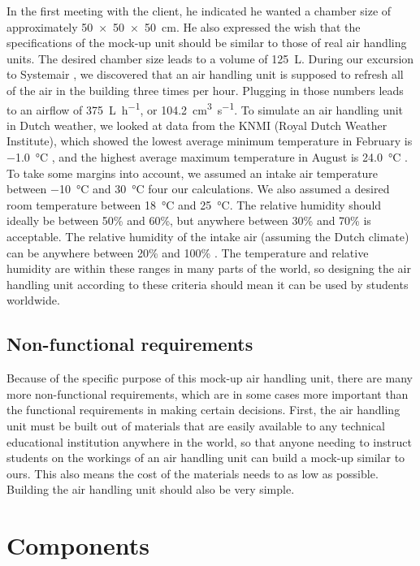 \documentclass[a4paper,oneside]{book}
\begin{document}
In the first meeting with the client, he indicated he wanted a chamber size of
approximately \SI{50x50x50}{\cm}. He also expressed the wish that the
specifications of the mock-up unit should be similar to those of real air
handling units. The desired chamber size leads to a volume of \SI{125}{\L}.
During our excursion to Systemair %
, we discovered that an air handling unit is
supposed to refresh all of the air in the building three times per hour.
Plugging in those numbers leads to an airflow of \SI{375}{\L\per\hour}, or
\SI{104.2}{\cm\cubed\per\s}. To simulate an air handling unit in Dutch weather,
we looked at data from the KNMI (Royal Dutch Weather Institute), which showed
the lowest average minimum temperature in February is \SI{-1.0}{\celsius}
\cite{knmi-min-feb}, and the highest average maximum temperature in August is
\SI{24.0}{\celsius} \cite{knmi-max-aug}. To take some margins into account, we
assumed an intake air temperature between \SI{-10}{\celsius} and
\SI{30}{\celsius} four our calculations. We also assumed a desired room
temperature between \SI{18}{\celsius} and \SI{25}{\celsius}.  The relative
humidity should ideally be between 50\% and 60\%, but anywhere between 30\% and
70\% is acceptable.  The relative humidity of the intake air (assuming the
Dutch climate) can be anywhere between 20\% and 100\% \cite{knmi-relh}.  The
temperature and relative humidity are within these ranges in many parts of the
world, so designing the air handling unit according to these criteria should
mean it can be used by students worldwide.

\section{Non-functional requirements}
Because of the specific purpose of this mock-up air handling unit, there are
many more non-functional requirements, which are in some cases more important
than the functional requirements in making certain decisions. First, the air
handling unit must be built out of materials that are easily available to any
technical educational institution anywhere in the world, so that anyone needing
to instruct students on the workings of an air handling unit can build a
mock-up similar to ours. This also means the cost of the materials needs to as
low as possible. Building the air handling unit should also be very simple.

\chapter{Components}
\end{document}
